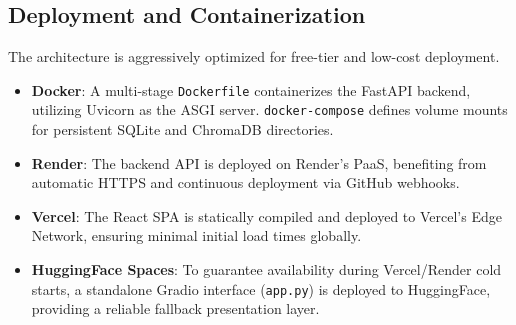 \subsection{Deployment and Containerization}
The architecture is aggressively optimized for free-tier and low-cost deployment. 
\begin{itemize}
    \item \textbf{Docker}: A multi-stage \texttt{Dockerfile} containerizes the FastAPI backend, utilizing Uvicorn as the ASGI server. \texttt{docker-compose} defines volume mounts for persistent SQLite and ChromaDB directories.
    \item \textbf{Render}: The backend API is deployed on Render's PaaS, benefiting from automatic HTTPS and continuous deployment via GitHub webhooks.
    \item \textbf{Vercel}: The React SPA is statically compiled and deployed to Vercel's Edge Network, ensuring minimal initial load times globally.
    \item \textbf{HuggingFace Spaces}: To guarantee availability during Vercel/Render cold starts, a standalone Gradio interface (\texttt{app.py}) is deployed to HuggingFace, providing a reliable fallback presentation layer.
\end{itemize}
